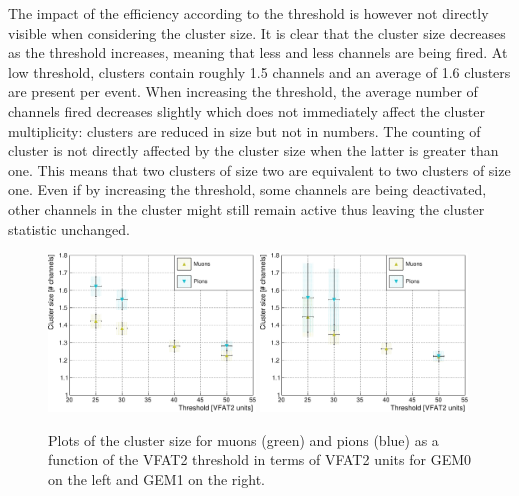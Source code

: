       The impact of the efficiency according to the threshold is however not directly visible when considering the cluster size. It is clear that the cluster size decreases as the threshold increases, meaning that less and less channels are being fired. At low threshold, clusters contain roughly 1.5 channels and an average of 1.6 clusters are present per event. When increasing the threshold, the average number of channels fired decreases slightly which does not immediately affect the cluster multiplicity: clusters are reduced in size but not in numbers. The counting of cluster is not directly affected by the cluster size when the latter is greater than one. This means that two clusters of size two are equivalent to two clusters of size one. Even if by increasing the threshold, some channels are being deactivated, other channels in the cluster might still remain active thus leaving the cluster statistic unchanged. \\

      \begin{figure}[h!]
        \centering
        \includegraphics[width=0.49\textwidth]{img/plots/cClusterSize_Threshold_GEM0-crop}
        \includegraphics[width=0.49\textwidth]{img/plots/cClusterSize_Threshold_GEM1-crop}
        \caption{Plots of the cluster size for muons (green) and pions (blue) as a function of the VFAT2 threshold in terms of VFAT2 units for GEM0 on the left and GEM1 on the right.}
        \label{fig:II-3-data-clu-size}
      \end{figure}


